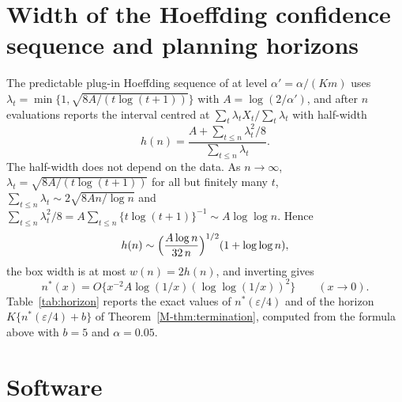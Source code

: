 \section{Width of the Hoeffding confidence sequence and planning horizons}\label{sec:hoeffding}

The predictable plug-in Hoeffding sequence of \citet[Proposition~1]{waudbysmith2024} at level $\alpha'=\alpha/(Km)$ uses $\lambda_t=\min\{1,\sqrt{8A/(t\log(t+1))}\}$ with $A=\log(2/\alpha')$, and after $n$ evaluations reports the interval centred at $\sum_t\lambda_tX_t/\sum_t\lambda_t$ with half-width
\[
h(n)=\frac{A+\sum_{t\le n}\lambda_t^2/8}{\sum_{t\le n}\lambda_t}.
\]
The half-width does not depend on the data. As $n\to\infty$, $\lambda_t=\sqrt{8A/(t\log(t+1))}$ for all but finitely many $t$, $\sum_{t\le n}\lambda_t\sim2\sqrt{8An/\log n}$ and $\sum_{t\le n}\lambda_t^2/8=A\sum_{t\le n}\{t\log(t+1)\}^{-1}\sim A\log\log n$. Hence
\[
h(n)\sim\Bigl(\frac{A\log n}{32\,n}\Bigr)^{1/2}(1+\log\log n),
\]
the box width is at most $w(n)=2h(n)$, and inverting gives
\[
n^*(x)=O\{x^{-2}A\log(1/x)(\log\log(1/x))^2\}\qquad(x\to0).
\]
 Table~\ref{tab:horizon} reports the exact values of $n^*(\varepsilon/4)$ and of the horizon $K\{n^*(\varepsilon/4)+b\}$ of Theorem~\ref{M-thm:termination}, computed from the formula above with $b=5$ and $\alpha=0.05$.

\begin{table}[ht]
\centering
\caption{Sufficient budgets of Theorem~\ref{M-thm:termination} for the predictable plug-in Hoeffding sequence, $\alpha=0.05$, $b=5$: number of evaluations per alternative $n^*(\varepsilon/4)$ and total horizon $K\{n^*(\varepsilon/4)+b\}$.}
\label{tab:horizon}
\small

\end{table}

\section{Software}\label{sec:software}

